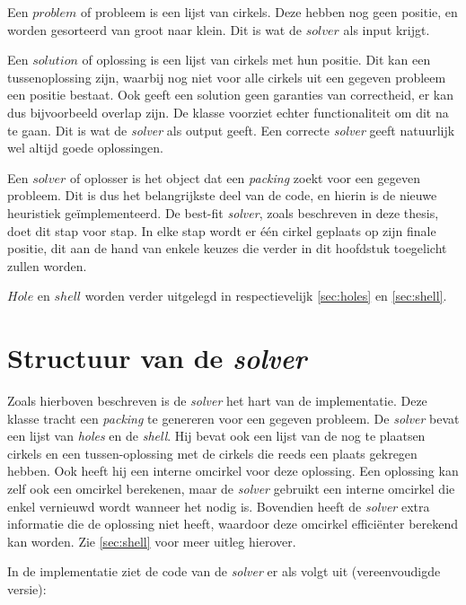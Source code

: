 \documentclass[12pt,a4paper,oneside]{book}
\begin{document}
Een $problem$ of probleem is een lijst van cirkels.
Deze hebben nog geen positie, en worden gesorteerd van groot naar klein.
Dit is wat de $solver$ als input krijgt.

Een $solution$ of oplossing is een lijst van cirkels met hun positie.
Dit kan een tussenoplossing zijn, waarbij nog niet voor alle cirkels uit een gegeven probleem een positie bestaat.
Ook geeft een solution geen garanties van correctheid, er kan dus bijvoorbeeld overlap zijn. De klasse voorziet echter functionaliteit om dit na te gaan.
Dit is wat de \textit{solver} als output geeft.
Een correcte \textit{solver} geeft natuurlijk wel altijd goede oplossingen.

Een $solver$ of oplosser is het object dat een \textit{packing} zoekt voor een gegeven probleem.
Dit is dus het belangrijkste deel van de code, en hierin is de nieuwe heuristiek geïmplementeerd.
De best-fit \textit{solver}, zoals beschreven in deze thesis, doet dit stap voor stap.
In elke stap wordt er één cirkel geplaats op zijn finale positie, dit aan de hand van enkele keuzes die verder in dit hoofdstuk toegelicht zullen worden.

$Hole$ en $shell$ worden verder uitgelegd in respectievelijk \autoref{sec:holes} en \autoref{sec:shell}.

\section{Structuur van de \textit{solver}}

Zoals hierboven beschreven is de \textit{solver} het hart van de implementatie.
Deze klasse tracht een \textit{packing} te genereren voor een gegeven probleem.
De \textit{solver} bevat een lijst van \textit{holes} en de \textit{shell}.
Hij bevat ook een lijst van de nog te plaatsen cirkels en een tussen-oplossing met de cirkels die reeds een plaats gekregen hebben.
Ook heeft hij een interne omcirkel voor deze oplossing.
Een oplossing kan zelf ook een omcirkel berekenen, maar de \textit{solver} gebruikt een interne omcirkel die enkel vernieuwd wordt wanneer het nodig is.
Bovendien heeft de \textit{solver} extra informatie die de oplossing niet heeft, waardoor deze omcirkel efficiënter berekend kan worden.
Zie \autoref{sec:shell} voor meer uitleg hierover.

In de implementatie ziet de code van de \textit{solver} er als volgt uit (vereenvoudigde versie):
\end{document}
